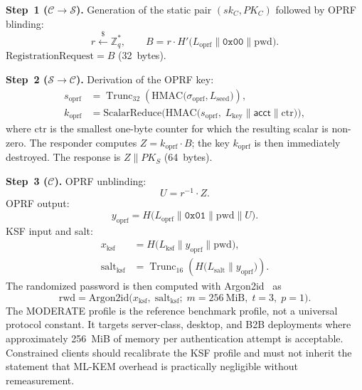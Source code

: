 \documentclass[preprint,12pt]{elsarticle}
\newcommand{\acct}{\mathsf{acct}}
\newcommand{\sigoprf}{\sigma_{\mathrm{oprf}}}
\newcommand{\Label}[1]{L_{\mathrm{#1}}}
\theoremstyle{remark}
\begin{document}
\textbf{Step~1 ($\mathcal{C} \to \mathcal{S}$).} Generation of the
static pair $(sk_C, PK_C)$ followed by OPRF blinding:
\begin{equation}
  r \xleftarrow{\$} \mathbb{Z}_q^*, \qquad
  B = r \cdot H'\!\bigl(\Label{oprf} \| \mathtt{0x00} \| \mathrm{pwd}\bigr).
  \label{eq:reg-blind}
\end{equation}
$\mathrm{RegistrationRequest} = B$ (32~bytes).

\textbf{Step~2 ($\mathcal{S} \to \mathcal{C}$).} Derivation of the OPRF
key:
\begin{align}
  s_{\mathrm{oprf}}
    &= \operatorname{Trunc}_{32}\!\left(
      \mathrm{HMAC}\!\bigl(\sigoprf, \Label{seed}\bigr)\right),
    \label{eq:oprf-seed}\\
  k_{\mathrm{oprf}}
    &= \mathrm{ScalarReduce}\!\bigl(
      \mathrm{HMAC}\!\bigl(
        s_{\mathrm{oprf}},\;
        \Label{key} \| \acct \| \mathrm{ctr}
      \bigr)\bigr),
    \label{eq:oprf-key}
\end{align}
where $\mathrm{ctr}$ is the smallest one-byte counter for which the resulting
scalar is non-zero. The responder computes
$Z = k_{\mathrm{oprf}} \cdot B$; the key $k_{\mathrm{oprf}}$ is then
immediately destroyed. The response is
$Z \| PK_S$ (64~bytes).

\textbf{Step~3 ($\mathcal{C}$).} OPRF unblinding:
\[
  U = r^{-1} \cdot Z.
\]
OPRF output:
\begin{equation}
  y_{\mathrm{oprf}} = H\!\bigl(\Label{oprf} \|
    \mathtt{0x01} \| \mathrm{pwd} \| U\bigr).
  \label{eq:oprf-output}
\end{equation}
KSF input and salt:
\begin{align}
  x_{\mathrm{ksf}}
    &= H\!\bigl(\Label{ksf} \|
      y_{\mathrm{oprf}} \| \mathrm{pwd}\bigr),\\
  \mathrm{salt}_{\mathrm{ksf}}
    &= \operatorname{Trunc}_{16}\!\left(
      H\!\bigl(\Label{salt} \| y_{\mathrm{oprf}}\bigr)\right).
\end{align}
The randomized password is then computed with Argon2id~\cite{biryukov2016}
as
\begin{equation}
  \mathrm{rwd} = \mathrm{Argon2id}\!\bigl(
    x_{\mathrm{ksf}},\; \mathrm{salt}_{\mathrm{ksf}};\;
    m = 256~\mathrm{MiB},\; t = 3,\; p = 1\bigr).
  \label{eq:rwd}
\end{equation}
The MODERATE profile is the reference benchmark profile, not a universal
protocol constant. It targets server-class, desktop, and B2B deployments
where approximately 256~MiB of memory per authentication attempt is
acceptable. Constrained clients should recalibrate the KSF profile and
must not inherit the statement that ML-KEM overhead is practically
negligible without remeasurement.
\end{document}
